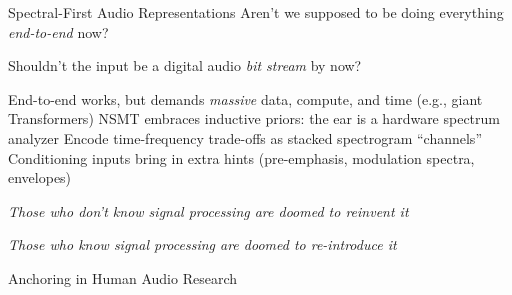 \begin{slide}[\slideopts,toc={Spectra}]{Spectral-First Audio Representations}
  Aren't we supposed to be doing everything \emph{end-to-end} now?

  Shouldn't the input be a digital audio \emph{bit stream} by now?

  \begin{itemize}
    \mpitem End-to-end works, but demands \emph{massive} data, compute, and time (e.g., giant Transformers)
    \mpitem NSMT embraces inductive priors: the ear is a hardware spectrum analyzer
    \mpitem Encode time-frequency trade-offs as stacked spectrogram ``channels''
    \mpitem Conditioning inputs bring in extra hints (pre-emphasis, modulation spectra, envelopes)
  \end{itemize}
  \vspace{-0.5em}
  \maybepause
    \centerline{\textit{Those who don't know signal processing are doomed to reinvent it}}
  \maybepause
    \centerline{\textit{Those who know signal processing are doomed to re-introduce it}}
\end{slide}

\begin{wideslide}[\slideopts,toc={Context}]{Anchoring in Human Audio Research}
\end{wideslide}

